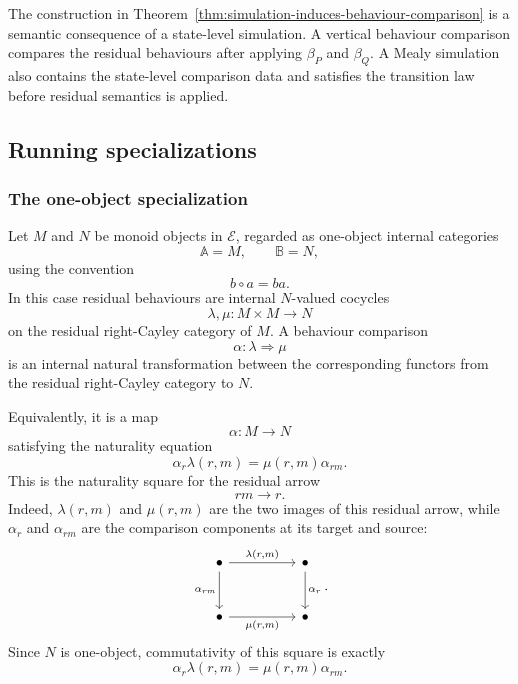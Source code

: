 \begin{remark}
\label{rem:simulation-to-comparison-not-equivalence}
    The construction in Theorem~\ref{thm:simulation-induces-behaviour-comparison} is a semantic consequence of a state-level simulation. A vertical behaviour comparison compares the residual behaviours after applying \(\beta_P\) and \(\beta_Q\). A Mealy simulation also contains the state-level comparison data and satisfies the transition law before residual semantics is applied.
\end{remark}

\subsection{Running specializations}
\label{subsec:simulations-running-specializations}

\subsubsection{The one-object specialization}

Let \(M\) and \(N\) be monoid objects in \(\mathcal E\), regarded as one-object internal categories
\[
    \mathbb A=M,
    \qquad
    \mathbb B=N,
\]
using the convention
\[
    b\circ a=ba.
\]
In this case residual behaviours are internal \(N\)-valued cocycles
\[
    \lambda,\mu:M\times M\to N
\]
on the residual right-Cayley category of \(M\). A behaviour comparison
\[
    \alpha:\lambda\Rightarrow\mu
\]
is an internal natural transformation between the corresponding functors from the residual right-Cayley category to \(N\).

Equivalently, it is a map
\[
    \alpha:M\to N
\]
satisfying the naturality equation
\[
    \alpha_r\lambda(r,m)=\mu(r,m)\alpha_{rm}.
\]
This is the naturality square for the residual arrow
\[
    rm\longrightarrow r.
\]
Indeed, \(\lambda(r,m)\) and \(\mu(r,m)\) are the two images of this residual arrow, while \(\alpha_r\) and \(\alpha_{rm}\) are the comparison components at its target and source:
\[
    \begin{tikzcd}[column sep=huge, row sep=large]
            \bullet
                \arrow[r, "{ \lambda (r,m) }"]
                \arrow[d, "{ \alpha_{rm} }"']
        &
            \bullet
                \arrow[d, "{ \alpha_r }"]
        \\
            \bullet
                \arrow[r, "{ \mu(r,m) }"']
        &
            \bullet
    \end{tikzcd}.
\]
Since \(N\) is one-object, commutativity of this square is exactly
\[
    \alpha_r\lambda(r,m)=\mu(r,m)\alpha_{rm}.
\]

